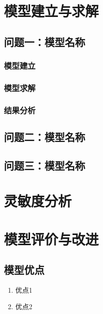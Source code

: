 \documentclass[12pt,a4paper]{ctexart}
\begin{document}
\section{模型建立与求解}

\subsection{问题一：模型名称}
\subsubsection{模型建立}

\subsubsection{模型求解}

\subsubsection{结果分析}

\subsection{问题二：模型名称}

\subsection{问题三：模型名称}

\section{灵敏度分析}

\section{模型评价与改进}

\subsection{模型优点}
\begin{enumerate}
    \item 优点1
    \item 优点2
\end{enumerate}
\end{document}
